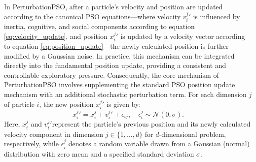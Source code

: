 {In PerturbationPSO, after a particle's velocity and position are updated according to the canonical PSO equations---where velocity $v_{i}^{j}{}'$ is influenced by inertia, cognitive, and social components according to equation \eqref{eq:velocity_update}, and position $x_{i}^{j}{}'$ is updated by a velocity vector according to equation \eqref{eq:position_update}---the newly calculated position is further modified by a Gaussian noise. In practice, this mechanism can be integrated directly into the fundamental position update, providing a consistent and controllable exploratory pressure. Consequently, the core mechanism of PerturbationPSO involves supplementing the standard PSO position update mechanism with an additional stochastic perturbation term. For each dimension $j$ of particle $i$, the new position $x_{i}^{j}{}'$ is given by:
\begin{equation}\label{eq:position_update_perturbation}
x_{i}^{j}{}' = x_{i}^{j} + v_{i}^{j}{}' + \epsilon_{ij}, \quad \epsilon_{i}^{j} \sim \mathcal{N}(0, \sigma).
\end{equation}
Here, $x_{i}^{j}$ and $v_{i}^{j}{}'$represent the particle's previous position and its newly calculated velocity component in dimension $j \in \{1,\ldots, d\}$ for $d$-dimensional problem, respectively, while $\epsilon_{i}^{j}$ denotes a random variable drawn from a Gaussian (normal) distribution with zero mean and a specified standard deviation $\sigma$.

\begin{figure}[H]
    \centering
\end{figure}}
